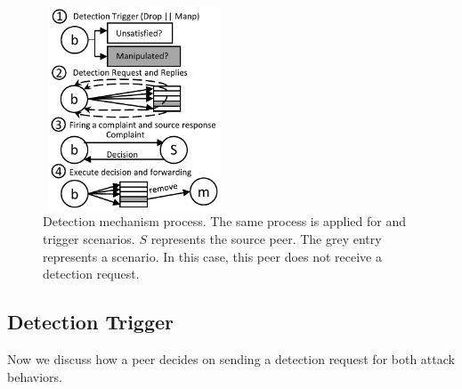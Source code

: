 \begin{figure}
 \centering
 \includegraphics[width=5.5cm,height=6cm]{./Figures/detection.pdf}
  \caption{Detection mechanism process. The same process is applied for \drop and \manp trigger scenarios. $S$ represents the source peer. The grey entry represents a \manp scenario. In this case, this peer does not receive a detection request.}
\label{detection-blocks} 
\end{figure}

\subsection{Detection Trigger}
\label{Detection-Trigger}
 Now we discuss how a peer decides on sending a detection request for both attack behaviors.
% 

